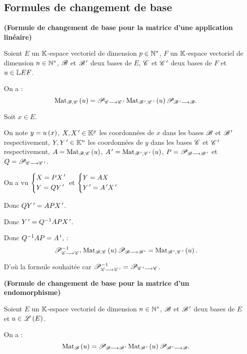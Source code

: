\subsection{Formules de changement de base}

\begin{prop}
{\normalfont\bfseries (Formule de changement de base pour la matrice d'une application linéaire)}

Soient \(E\) un \(\mathbb{K}\)-espace vectoriel de dimension \(p\in\mathbb{N}^*\), \(F\) un \(\mathbb{K}\)-espace vectoriel de dimension \(n\in\mathbb{N}^*\), \(\mathscr{B}\) et \(\mathscr{B}^{\,\prime}\) deux bases de \(E\), \(\mathscr{C}\) et \(\mathscr{C}^{\,\prime}\) deux bases de \(F\) et \(u\in\mathbb{L}{E}{F}\).

On a : \[\Mat[\fami{B},\fami{C}]{u}=\pass{\fami{C}}{\fami{C}\prim}\Mat[\fami{B}\prim,\fami{C}\prim]{u}\pass{\fami{B}\prim}{\fami{B}}.\]
\end{prop}

\begin{dem}
Soit \(x\in E\).

On note \(y=u\left(x\right)\), \(X,X^{\,\prime}\in\mathbb{K}^p\) les coordonnées de \(x\) dans les bases \(\mathscr{B}\) et \(\mathscr{B}^{\,\prime}\) respectivement, \(Y,Y^{\,\prime}\in\mathbb{K}^n\) les coordonnées de \(y\) dans les bases \(\mathscr{C}\) et \(\mathscr{C}^{\,\prime}\) respectivement, \(A=\Mat[\fami{B},\fami{C}]{u}\), \(A\prim=\Mat[\fami{B}\prim,\fami{C}\prim]{u}\), \(P=\mathscr{P}_{\mathscr{B}\longrightarrow\mathscr{B}^{\,\prime}}\) et \(Q=\mathscr{P}_{\mathscr{C}\longrightarrow\mathscr{C}^{\,\prime}}\).

On a vu \(\begin{dcases}
X=PX^{\,\prime} \\
Y=QY^{\,\prime}
\end{dcases}\) et \(\begin{dcases}
Y=AX \\
Y^{\,\prime}=A^{\,\prime} X^{\,\prime}
\end{dcases}\)

Donc \(QY^{\,\prime}=APX^{\,\prime}\).

Donc \(Y^{\,\prime}=Q^{-1} APX^{\,\prime}\).

Donc \(Q^{-1} AP=A^{\,\prime}\), \cad : \[\pass{\fami{C}}{\fami{C}\prim}\inv\Mat[\fami{B},\fami{C}]{u}\pass{\fami{B}}{\fami{B}\prim}=\Mat[\fami{B}\prim,\fami{C}\prim]{u}.\]

D'où la formule souhaitée car \(\mathscr{P}_{\mathscr{C}\longrightarrow\mathscr{C}^{\,\prime}}^{-1}=\mathscr{P}_{\mathscr{C}^{\,\prime}\longrightarrow\mathscr{C}}\).
\end{dem}

\begin{cor}
{\normalfont\bfseries (Formule de changement de base pour la matrice d'un endomorphisme)}

Soient \(E\) un \(\mathbb{K}\)-espace vectoriel de dimension \(n\in\mathbb{N}^*\), \(\mathscr{B}\) et \(\mathscr{B}^{\,\prime}\) deux bases de \(E\) et \(u\in\mathscr{L}\left(E\right)\).

On a : \[\Mat{u}=\pass{\fami{B}}{\fami{B}\prim}\Mat[\fami{B}\prim]{u}\pass{\fami{B}\prim}{\fami{B}}.\]
\end{cor}


